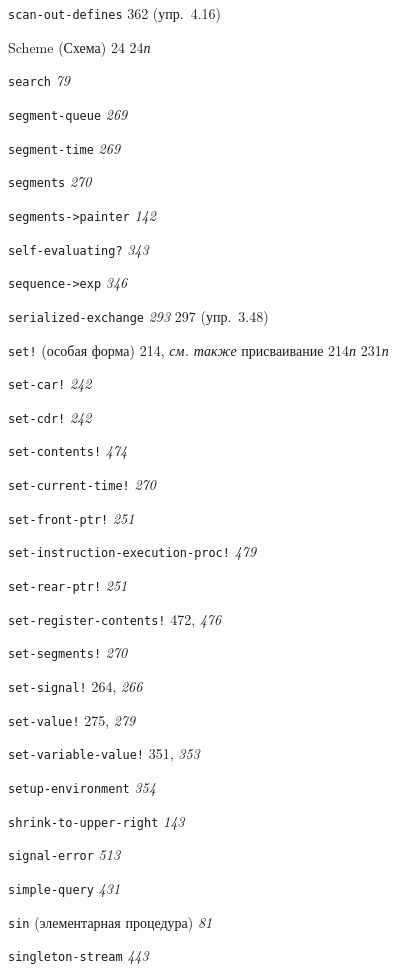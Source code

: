 \begin{theindex}
\item {\texttt{scan-out-defines}} 362 (упр.~4.16)
\item {Scheme (Схема)} 24
   24{\it п}
\item {\texttt{search}} {\it 79}
\item {\texttt{segment-queue}} {\it 269}
\item {\texttt{segment-time}} {\it 269}
\item {\texttt{segments}} {\it 270}
\item {\texttt{segments->painter}} {\it 142}
\item {\texttt{self-evaluating?}} {\it 343}
\item {\texttt{sequence->exp}} {\it 346}
\item {\texttt{serialized-exchange}} {\it 293}
   297 (упр.~3.48)
\item {\texttt{set!} (особая форма)} 214, {\it см. также} присваивание
   214{\it п}
   231{\it п}
\item {\texttt{set-car!}} {\it 242}
\item {\texttt{set-cdr!}} {\it 242}
\item {\texttt{set-contents!}} {\it 474}
\item {\texttt{set-current-time!}} {\it 270}
\item {\texttt{set-front-ptr!}} {\it 251}
\item {\texttt{set-instruction-execution-proc!}} {\it 479}
\item {\texttt{set-rear-ptr!}} {\it 251}
\item {\texttt{set-register-contents!}} 472, {\it 476}
\item {\texttt{set-segments!}} {\it 270}
\item {\texttt{set-signal!}} 264, {\it 266}
\item {\texttt{set-value!}} 275, {\it 279}
\item {\texttt{set-variable-value!}} 351, {\it 353}
\item {\texttt{setup-environment}} {\it 354}
\item {\texttt{shrink-to-upper-right}} {\it 143}
\item {\texttt{signal-error}} {\it 513}
\item {\texttt{simple-query}} {\it 431}
\item {\texttt{sin} (элементарная процедура)} {\it 81}
\item {\texttt{singleton-stream}} {\it 443}

\end{theindex}
